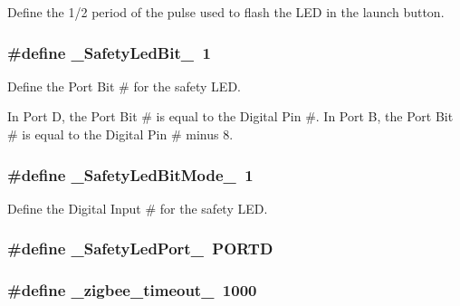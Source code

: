 \-Define the 1/2 period of the pulse used to flash the \-L\-E\-D in the launch button. 

\hypertarget{launchPad_8ino_a6aeae67497fe7befb28722f8356e5956}{
\subsubsection[{\-\_\-\-Safety\-Led\-Bit\-\_\-}]{\setlength{\rightskip}{0pt plus 5cm}\#define {\bf \-\_\-\-Safety\-Led\-Bit\-\_\-}~1}}\label{launchPad_8ino_a6aeae67497fe7befb28722f8356e5956}


\-Define the \-Port \-Bit \# for the safety \-L\-E\-D. 

\-In \-Port \-D, the \-Port \-Bit \# is equal to the \-Digital \-Pin \#. \-In \-Port \-B, the \-Port \-Bit \# is equal to the \-Digital \-Pin \# minus 8. \hypertarget{launchPad_8ino_a1a373dcba7ddfc401b86cb5ae2c3d0f6}{
\subsubsection[{\-\_\-\-Safety\-Led\-Bit\-Mode\-\_\-}]{\setlength{\rightskip}{0pt plus 5cm}\#define {\bf \-\_\-\-Safety\-Led\-Bit\-Mode\-\_\-}~1}}\label{launchPad_8ino_a1a373dcba7ddfc401b86cb5ae2c3d0f6}


\-Define the \-Digital \-Input \# for the safety \-L\-E\-D. 

\hypertarget{launchPad_8ino_a5be4de8c40301fb984c38e8aa1c505fe}{
\subsubsection[{\-\_\-\-Safety\-Led\-Port\-\_\-}]{\setlength{\rightskip}{0pt plus 5cm}\#define {\bf \-\_\-\-Safety\-Led\-Port\-\_\-}~\-P\-O\-R\-T\-D}}\label{launchPad_8ino_a5be4de8c40301fb984c38e8aa1c505fe}
\hypertarget{launchPad_8ino_a6b982ea9a4c912acbfd98bbd5072e258}{
\subsubsection[{\-\_\-zigbee\-\_\-timeout\-\_\-}]{\setlength{\rightskip}{0pt plus 5cm}\#define {\bf \-\_\-zigbee\-\_\-timeout\-\_\-}~1000}}\label{launchPad_8ino_a6b982ea9a4c912acbfd98bbd5072e258}



